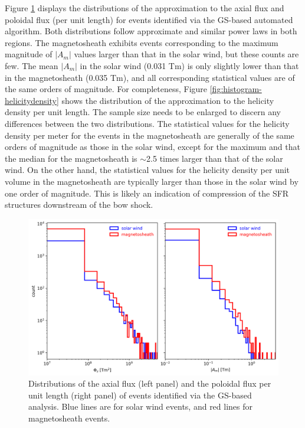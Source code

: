Figure \ref{fig:histogram-flux} displays the distributions of the approximation to the axial flux and poloidal flux (per unit length) for events identified via the GS-based automated algorithm. Both distributions follow approximate and similar power laws in both regions. The magnetosheath exhibits events corresponding to the maximum magnitude of $|A_m|$ values larger than that in the solar wind, but these counts are few. The mean $|A_m|$ in the solar wind (0.031 Tm) is only slightly lower than that in the magnetosheath (0.035 Tm), and all corresponding statistical values are of the same orders of magnitude. For completeness, Figure \ref{fig:histogram-helicitydensity} shows the distribution of the approximation to the helicity density per unit length. The sample size needs to be enlarged to discern any differences between the two distributions. The statistical values for the helicity density per meter for the events in the magnetosheath are generally of the same orders of magnitude as those in the solar wind, except for the maximum and that the median for the magnetosheath is $\sim$2.5 times larger than that of the solar wind. On the other hand, the statistical values for the helicity density per unit volume in the magnetosheath are typically larger than those in the solar wind by one order of magnitude. This is likely an indication of compression of the SFR structures downstream of the bow shock.
\begin{figure}
    \centering
    \includegraphics[width=\textwidth]{Figures/Histograms/histogram_flux_Am.png}
    \caption[Distributions of the axial flux and poloidal flux per unit length]{Distributions of the axial flux (left panel) and the poloidal flux per unit length (right panel) of events identified via the GS-based analysis. Blue lines are for solar wind events, and red lines for magnetosheath events.}
    \label{fig:histogram-flux}
\end{figure}


